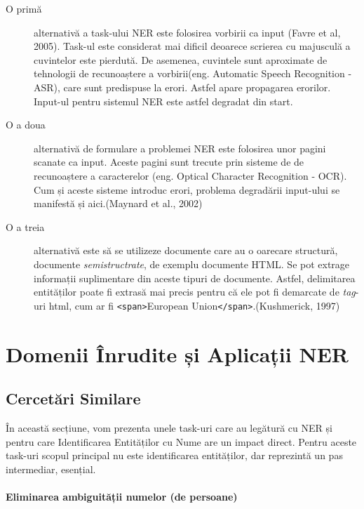 \begin{description}
\item[O primă] alternativă a task-ului NER este folosirea vorbirii ca input (Favre et al, 2005).\cite{favre2005} Task-ul este considerat mai dificil deoarece scrierea cu majusculă a cuvintelor este pierdută. De asemenea, cuvintele sunt aproximate de tehnologii de recunoaștere a vorbirii(eng. Automatic Speech Recognition - ASR), care sunt predispuse la erori. Astfel apare propagarea erorilor. Input-ul pentru sistemul NER este astfel degradat din start.

\item[O a doua] alternativă de formulare a problemei NER este folosirea unor pagini scanate ca input. Aceste pagini sunt trecute prin sisteme de de recunoaștere a caracterelor (eng. Optical Character Recognition - OCR). Cum și aceste sisteme introduc erori, problema degradării input-ului se manifestă și aici.(Maynard et al., 2002)\cite{maynard2002}

\item[O a treia] alternativă este să se utilizeze documente care au o oarecare structură, documente \textit{semistructrate}, de exemplu documente HTML. Se pot extrage informații suplimentare din aceste tipuri de documente. Astfel, delimitarea entităților poate fi extrasă mai precis pentru că ele pot fi demarcate de \textit{tag}-uri html, cum ar fi \texttt{<span>}European Union\texttt{</span>}.(Kushmerick, 1997)\cite{kushmerick1997}

\end{description}

\section{Domenii Înrudite și Aplicații NER}

\subsection{Cercetări Similare}

În această secțiune, vom prezenta unele task-uri care au legătură cu NER și pentru care Identificarea Entităților cu Nume are un impact direct. Pentru aceste task-uri scopul principal nu este identificarea entităților, dar reprezintă un pas intermediar, esențial.

\paragraph{Eliminarea ambiguității numelor (de persoane)}

